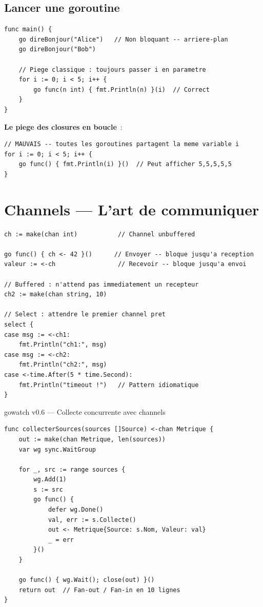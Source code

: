 \documentclass[11pt,a4paper,openany]{book}
\begin{document}
\section{Lancer une goroutine}

\begin{lstlisting}[style=goStyle]
func main() {
    go direBonjour("Alice")   // Non bloquant -- arriere-plan
    go direBonjour("Bob")

    // Piege classique : toujours passer i en parametre
    for i := 0; i < 5; i++ {
        go func(n int) { fmt.Println(n) }(i)  // Correct
    }
}
\end{lstlisting}

\begin{boiteAttention}
\textbf{Le piege des closures en boucle}~:
\begin{lstlisting}[style=goStyle]
// MAUVAIS -- toutes les goroutines partagent la meme variable i
for i := 0; i < 5; i++ {
    go func() { fmt.Println(i) }()  // Peut afficher 5,5,5,5,5
}
\end{lstlisting}
\end{boiteAttention}

\chapter{Channels --- L'art de communiquer}

\begin{lstlisting}[style=goStyle]
ch := make(chan int)           // Channel unbuffered

go func() { ch <- 42 }()      // Envoyer -- bloque jusqu'a reception
valeur := <-ch                 // Recevoir -- bloque jusqu'a envoi

// Buffered : n'attend pas immediatement un recepteur
ch2 := make(chan string, 10)

// Select : attendre le premier channel pret
select {
case msg := <-ch1:
    fmt.Println("ch1:", msg)
case msg := <-ch2:
    fmt.Println("ch2:", msg)
case <-time.After(5 * time.Second):
    fmt.Println("timeout !")   // Pattern idiomatique
}
\end{lstlisting}

\begin{boiteProjet}{gowatch v0.6 --- Collecte concurrente avec channels}
\begin{lstlisting}[style=goStyle]
func collecterSources(sources []Source) <-chan Metrique {
    out := make(chan Metrique, len(sources))
    var wg sync.WaitGroup

    for _, src := range sources {
        wg.Add(1)
        s := src
        go func() {
            defer wg.Done()
            val, err := s.Collecte()
            out <- Metrique{Source: s.Nom, Valeur: val}
            _ = err
        }()
    }

    go func() { wg.Wait(); close(out) }()
    return out  // Fan-out / Fan-in en 10 lignes
}
\end{lstlisting}
\end{boiteProjet}
\end{document}
